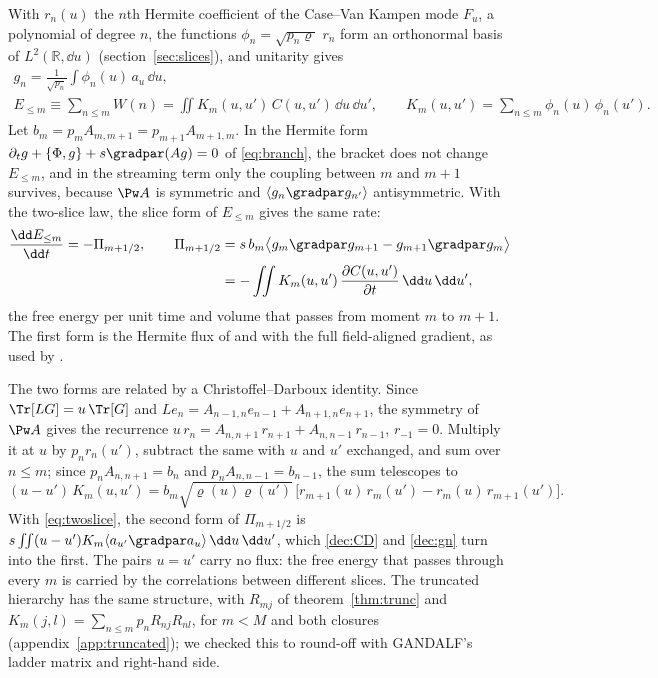 With $r_n(u)$ the $n$th Hermite coefficient of the Case--Van Kampen mode $F_u$, a polynomial of degree $n$, the functions $\phi_n=\sqrt{p_n\varrho}\;r_n$ form an orthonormal basis of $L^2(\mathbb R,\dd u)$ (section~\ref{sec:slices}), and unitarity gives
\begin{equation}\label{dec:gn}
\begin{gathered}
  g_n=\frac{1}{\sqrt{p_n}}\int\phi_n(u)\,a_u\,\dd u,\\
  E_{\le m}\equiv\sum_{n\le m}W(n)=\iint K_m(u,u')\,C(u,u')\,\dd u\,\dd u',\qquad
  K_m(u,u')=\sum_{n\le m}\phi_n(u)\,\phi_n(u') .
\end{gathered}
\end{equation}
Let $b_m=p_mA_{m,m+1}=p_{m+1}A_{m+1,m}$. In the Hermite form $\partial_tg+\{\Phi,g\}+s\gradpar(Ag)=0$ of \eqref{eq:branch}, the bracket does not change $E_{\le m}$, and in the streaming term only the coupling between $m$ and $m+1$ survives, because $\Pw A$ is symmetric and $\langle g_n\gradpar g_{n'}\rangle$ antisymmetric. With the two-slice law, the slice form of $E_{\le m}$ gives the same rate:
\begin{equation}\label{eq:fluxCD}
\begin{aligned}
  \frac{\dd E_{\le m}}{\dd t}=-\Pi_{m+1/2},\qquad
  \Pi_{m+1/2}&=s\,b_m\big\langle g_m\gradpar g_{m+1}-g_{m+1}\gradpar g_m\big\rangle\\
  &=-\iint K_m(u,u')\,\frac{\partial C(u,u')}{\partial t}\,\dd u\,\dd u' ,
\end{aligned}
\end{equation}
the free energy per unit time and volume that passes from moment $m$ to $m+1$. The first form is the Hermite flux of \citet{Schekochihin2016} and \citet{AdkinsSchekochihin2018} with the full field-aligned gradient, as used by \citet[eq.~9]{Meyrand2019}.

The two forms are related by a Christoffel--Darboux identity. Since $\Tr[LG]=u\,\Tr[G]$ and $Le_n=A_{n-1,n}e_{n-1}+A_{n+1,n}e_{n+1}$, the symmetry of $\Pw A$ gives the recurrence $u\,r_n=A_{n,n+1}\,r_{n+1}+A_{n,n-1}\,r_{n-1}$, $r_{-1}=0$. Multiply it at $u$ by $p_nr_n(u')$, subtract the same with $u$ and $u'$ exchanged, and sum over $n\le m$; since $p_nA_{n,n+1}=b_n$ and $p_nA_{n,n-1}=b_{n-1}$, the sum telescopes to
\begin{equation}\label{dec:CD}
  (u-u')\,K_m(u,u')=b_m\sqrt{\varrho(u)\varrho(u')}\,\big[r_{m+1}(u)\,r_m(u')-r_m(u)\,r_{m+1}(u')\big] .
\end{equation}
With \eqref{eq:twoslice}, the second form of $\Pi_{m+1/2}$ is $s\iint(u-u')K_m\langle a_{u'}\gradpar a_u\rangle\,\dd u\,\dd u'$, which \eqref{dec:CD} and \eqref{dec:gn} turn into the first. The pairs $u=u'$ carry no flux: the free energy that passes through every $m$ is carried by the correlations between different slices. The truncated hierarchy has the same structure, with $R_{mj}$ of theorem~\ref{thm:trunc} and $K_m(j,l)=\sum_{n\le m}p_nR_{nj}R_{nl}$, for $m<M$ and both closures (appendix~\ref{app:truncated}); we checked this to round-off with GANDALF's ladder matrix and right-hand side.

